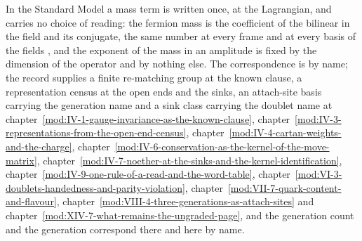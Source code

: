 \begin{chbridge}
In the Standard Model a mass term is written once, at the Lagrangian, and carries no choice of reading: the fermion mass is the coefficient of the bilinear in the field and its conjugate, the same number at every frame and at every basis of the fields \cite{Weinberg1967}, and the exponent of the mass in an amplitude is fixed by the dimension of the operator and by nothing else. The correspondence is by name; the record supplies a finite re-matching group at the known clause, a representation census at the open ends and the sinks, an attach-site basis carrying the generation name and a sink class carrying the doublet name at chapter~\ref{mod:IV-1-gauge-invariance-as-the-known-clause}, chapter~\ref{mod:IV-3-representations-from-the-open-end-census}, chapter~\ref{mod:IV-4-cartan-weights-and-the-charge}, chapter~\ref{mod:IV-6-conservation-as-the-kernel-of-the-move-matrix}, chapter~\ref{mod:IV-7-noether-at-the-sinks-and-the-kernel-identification}, chapter~\ref{mod:IV-9-one-rule-of-a-read-and-the-word-table}, chapter~\ref{mod:VI-3-doublets-handedness-and-parity-violation}, chapter~\ref{mod:VII-7-quark-content-and-flavour}, chapter~\ref{mod:VIII-4-three-generations-as-attach-sites} and chapter~\ref{mod:XIV-7-what-remains-the-ungraded-page}, and the generation count and the generation correspond there and here by name.
\end{chbridge}
